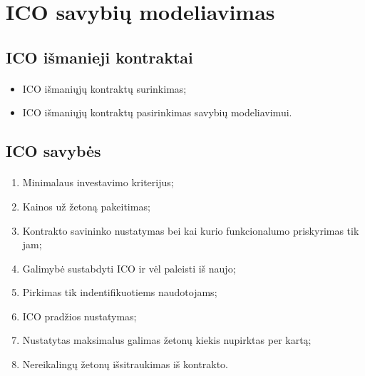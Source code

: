 \documentclass{beamer}
\begin{document}
\section{ICO savybių modeliavimas}
\subsection{ICO išmanieji kontraktai}
\begin{frame}{\insertsection}
	\framesubtitle{\insertsubsection}
    \vspace{-40.5pt}
    \begin{itemize}
        \item ICO išmaniųjų kontraktų surinkimas;
        \item ICO išmaniųjų kontraktų pasirinkimas savybių modeliavimui.
    \end{itemize}
	
\end{frame}



\subsection{ICO savybės}
\begin{frame}[fragile]{\insertsection}
	\framesubtitle{\insertsubsection}
    \begin{enumerate} 
        \item Minimalaus investavimo kriterijus;
        \item Kainos už žetoną pakeitimas;
        \item Kontrakto savininko nustatymas bei kai kurio funkcionalumo priskyrimas tik jam;
        \item Galimybė sustabdyti ICO ir vėl paleisti iš naujo;
        \item Pirkimas tik indentifikuotiems naudotojams;
        \item ICO pradžios nustatymas;
        \item Nustatytas maksimalus galimas žetonų kiekis nupirktas per kartą;
        \item Nereikalingų žetonų išsitraukimas iš kontrakto.
    \end{enumerate}
\end{frame}
\end{document}
